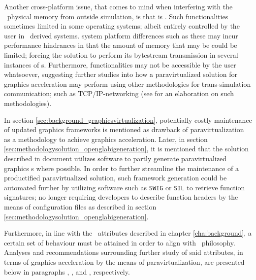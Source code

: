 Another cross-platform issue, that comes to mind when interfering with the \dvttermtarget\ physical memory from outside simulation, is that is .
Such functionalities sometimes limited in some operating systems; albeit entirely controlled by the user in \dvttermlinux\ derived systems.
 system platform differences such as these may incur performance hindrances in that the amount of memory that may be  could be limited; forcing the solution to perform its bytestream transmission in several instances of \dvttermmagicinstruction s.
Furthermore,  functionalities may not be accessible by the user whatsoever, suggesting further studies into how a paravirtualized solution for graphics acceleration may perform using other methodologies for trans-simulation communication; such as TCP/IP-networking (see  for an elaboration on such methodologies).

In section \ref{sec:background_graphicsvirtualization}, potentially costly maintenance of updated graphics frameworks is mentioned as drawback of paravirtualization as a methodology to achieve graphics acceleration.
Later, in section \ref{sec:methodologysolution_openglabigeneration}, it is mentioned that the solution described in document utilizes software to partly generate paravirtualized graphics \dvttermabi s where possible.
In order to further streamline the maintenance of a productified paravirtualized solution, such framework generation could be automated further by utilizing software such as \texttt{SWIG} or \texttt{SIL} to retrieve function signatures; no longer requiring developers to describe function headers by the means of configuration files as described in section \ref{sec:methodologysolution_openglabigeneration}.

Furthermore, in line with the \dvttermsimics\ attributes described in chapter \ref{cha:background}, a certain set of behaviour must be attained in order to align with \dvttermsimics\ philosophy.
Analyses and recommendations surrounding further study of said attributes, in terms of graphics acceleration by the means of paravirtualization, are presented below in paragraphs , , and , respectively.

